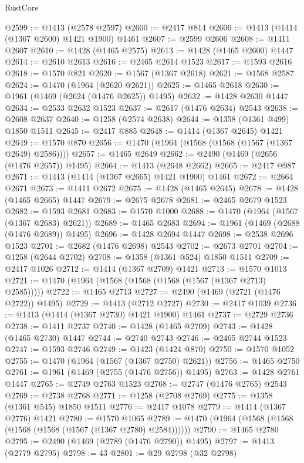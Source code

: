 \begin{lexlean}{RustCore}
\begin{coremodule}
@2599 := @1413 (@2578 @2597)
@2600 := @2417 @814
@2606 := @1413 (@1414 (@1367 @2600) @1421 @1900) @1461
@2607 := @2599 @2606
@2608 := @1411 @2607
@2610 := @1428 (@1465 @2575)
@2613 := @1428 (@1465 @2600) @1447
@2614 := @2610 @2613
@2616 := @2465 @2614 @1523
@2617 := @1593 @2616
@2618 := @1570 @821
@2620 := @1567 (@1367 @2618)
@2621 := @1568 @2587
@2624 := @1470 (@1964 (@2620 @2621))
@2625 := @1465 @2618
@2630 := @1961 (@1469 (@2624 (@1476 @2625)) @1495)
@2632 := @1428 @2630 @1447
@2634 := @2533 @2632 @1523
@2637 := @2617 (@1476 @2634) @2543
@2638 := @2608 @2637
@2640 := @1258 (@2574 @2638)
@2644 := @1358 (@1361 @499) @1850 @1511
@2645 := @2417 @885
@2648 := @1414 (@1367 @2645) @1421
@2649 := @1570 @870
@2656 := @1470 (@1964 (@1568 (@1568 (@1567 (@1367 @2649) @2586))))
@2657 := @1465 @2649
@2662 := @2490 (@1469 (@2656 (@1476 @2657)) @1495)
@2664 := @1413 (@2648 @2662)
@2665 := @2417 @987
@2671 := @1413 (@1414 (@1367 @2665) @1421 @1900) @1461
@2672 := @2664 @2671
@2673 := @1411 @2672
@2675 := @1428 (@1465 @2645)
@2678 := @1428 (@1465 @2665) @1447
@2679 := @2675 @2678
@2681 := @2465 @2679 @1523
@2682 := @1593 @2681
@2683 := @1570 @1000
@2688 := @1470 (@1964 (@1567 (@1367 @2683) @2621))
@2689 := @1465 @2683
@2694 := @1961 (@1469 (@2688 (@1476 @2689)) @1495)
@2696 := @1428 @2694 @1447
@2698 := @2538 @2696 @1523
@2701 := @2682 (@1476 @2698) @2543
@2702 := @2673 @2701
@2704 := @1258 (@2644 @2702)
@2708 := @1358 (@1361 @524) @1850 @1511
@2709 := @2417 @1026
@2712 := @1414 (@1367 @2709) @1421
@2713 := @1570 @1013
@2721 := @1470 (@1964 (@1568 (@1568 (@1568 (@1567 (@1367 @2713) @2585)))))
@2722 := @1465 @2713
@2727 := @2490 (@1469 (@2721 (@1476 @2722)) @1495)
@2729 := @1413 (@2712 @2727)
@2730 := @2417 @1039
@2736 := @1413 (@1414 (@1367 @2730) @1421 @1900) @1461
@2737 := @2729 @2736
@2738 := @1411 @2737
@2740 := @1428 (@1465 @2709)
@2743 := @1428 (@1465 @2730) @1447
@2744 := @2740 @2743
@2746 := @2465 @2744 @1523
@2747 := @1593 @2746
@2749 := @1423 (@1424 @870)
@2750 := @1570 @1052
@2755 := @1470 (@1964 (@1567 (@1367 @2750) @2621))
@2756 := @1465 @2750
@2761 := @1961 (@1469 (@2755 (@1476 @2756)) @1495)
@2763 := @1428 @2761 @1447
@2765 := @2749 @2763 @1523
@2768 := @2747 (@1476 @2765) @2543
@2769 := @2738 @2768
@2771 := @1258 (@2708 @2769)
@2775 := @1358 (@1361 @545) @1850 @1511
@2776 := @2417 @1078
@2779 := @1414 (@1367 @2776) @1421
@2780 := @1570 @1065
@2789 := @1470 (@1964 (@1568 (@1568 (@1568 (@1568 (@1567 (@1367 @2780) @2584))))))
@2790 := @1465 @2780
@2795 := @2490 (@1469 (@2789 (@1476 @2790)) @1495)
@2797 := @1413 (@2779 @2795)
@2798 := 43
@2801 := @29 @2798 (@32 @2798)

\end{coremodule}
\end{lexlean}
